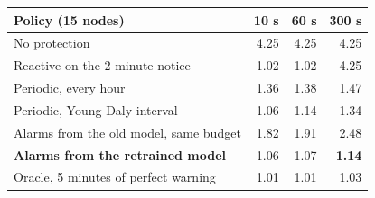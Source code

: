 \begin{tabular}{lrrr}
\toprule
Policy (15 nodes) & 10 s & 60 s & 300 s \\
\midrule
No protection & 4.25 & 4.25 & 4.25 \\
Reactive on the 2-minute notice & 1.02 & 1.02 & 4.25 \\
Periodic, every hour & 1.36 & 1.38 & 1.47 \\
Periodic, Young-Daly interval & 1.06 & 1.14 & 1.34 \\
Alarms from the old model, same budget & 1.82 & 1.91 & 2.48 \\
\textbf{Alarms from the retrained model} & 1.06 & 1.07 & \textbf{1.14} \\
Oracle, 5 minutes of perfect warning & 1.01 & 1.01 & 1.03 \\
\bottomrule
\end{tabular}
